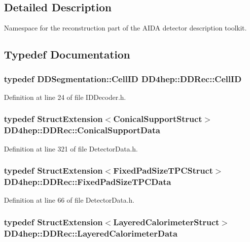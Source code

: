 \subsection{Detailed Description}
Namespace for the reconstruction part of the AIDA detector description toolkit. 

\subsection{Typedef Documentation}
\hypertarget{namespace_d_d4hep_1_1_d_d_rec_af5cecc2e566eeaedb430b92df23971d4}{
\subsubsection[{CellID}]{\setlength{\rightskip}{0pt plus 5cm}typedef {\bf DDSegmentation::CellID} {\bf DD4hep::DDRec::CellID}}}
\label{namespace_d_d4hep_1_1_d_d_rec_af5cecc2e566eeaedb430b92df23971d4}


Definition at line 24 of file IDDecoder.h.\hypertarget{namespace_d_d4hep_1_1_d_d_rec_ad032e209cba53400573169b32816f1c9}{
\subsubsection[{ConicalSupportData}]{\setlength{\rightskip}{0pt plus 5cm}typedef {\bf StructExtension}$<${\bf ConicalSupportStruct}$>$ {\bf DD4hep::DDRec::ConicalSupportData}}}
\label{namespace_d_d4hep_1_1_d_d_rec_ad032e209cba53400573169b32816f1c9}


Definition at line 321 of file DetectorData.h.\hypertarget{namespace_d_d4hep_1_1_d_d_rec_a4fe537dc27f78fad18b8182f6f167ca1}{
\subsubsection[{FixedPadSizeTPCData}]{\setlength{\rightskip}{0pt plus 5cm}typedef {\bf StructExtension}$<${\bf FixedPadSizeTPCStruct}$>$ {\bf DD4hep::DDRec::FixedPadSizeTPCData}}}
\label{namespace_d_d4hep_1_1_d_d_rec_a4fe537dc27f78fad18b8182f6f167ca1}


Definition at line 66 of file DetectorData.h.\hypertarget{namespace_d_d4hep_1_1_d_d_rec_ab7bf707189c3166efa20740e6f7524b9}{
\subsubsection[{LayeredCalorimeterData}]{\setlength{\rightskip}{0pt plus 5cm}typedef {\bf StructExtension}$<${\bf LayeredCalorimeterStruct}$>$ {\bf DD4hep::DDRec::LayeredCalorimeterData}}}
\label{namespace_d_d4hep_1_1_d_d_rec_ab7bf707189c3166efa20740e6f7524b9}


